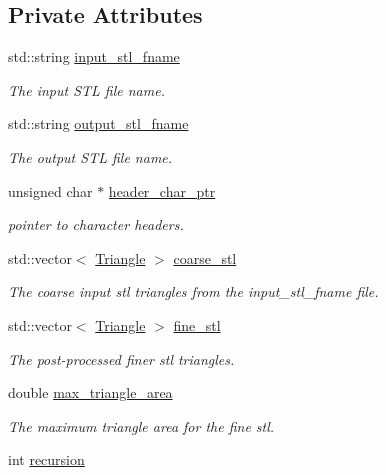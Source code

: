 \subsection*{Private Attributes}
\begin{DoxyCompactItemize}
\item 
std\-::string \hyperlink{classkia_1_1Mesh_aec61d34b51d3fbd92b7198465acac609}{input\-\_\-stl\-\_\-fname}
\begin{DoxyCompactList}\small\item\em The input S\-T\-L file name. \end{DoxyCompactList}\item 
std\-::string \hyperlink{classkia_1_1Mesh_a09889245e99dcf6e1fc79802f4898be5}{output\-\_\-stl\-\_\-fname}
\begin{DoxyCompactList}\small\item\em The output S\-T\-L file name. \end{DoxyCompactList}\item 
unsigned char $\ast$ \hyperlink{classkia_1_1Mesh_a07e1afe05908123512092752cf5a6215}{header\-\_\-char\-\_\-ptr}
\begin{DoxyCompactList}\small\item\em pointer to character headers. \end{DoxyCompactList}\item 
std\-::vector$<$ \hyperlink{classkia_1_1Triangle}{Triangle} $>$ \hyperlink{classkia_1_1Mesh_a5cdfbbf0ea30fb6a1bc220aab1252c1c}{coarse\-\_\-stl}
\begin{DoxyCompactList}\small\item\em The coarse input stl triangles from the input\-\_\-stl\-\_\-fname file. \end{DoxyCompactList}\item 
std\-::vector$<$ \hyperlink{classkia_1_1Triangle}{Triangle} $>$ \hyperlink{classkia_1_1Mesh_a16b183e73546b40a40592c0a42f2eba2}{fine\-\_\-stl}
\begin{DoxyCompactList}\small\item\em The post-\/processed finer stl triangles. \end{DoxyCompactList}\item 
double \hyperlink{classkia_1_1Mesh_a10186516a1cf2cd6d65a84cbf31517d6}{max\-\_\-triangle\-\_\-area}
\begin{DoxyCompactList}\small\item\em The maximum triangle area for the fine stl. \end{DoxyCompactList}\item 
int \hyperlink{classkia_1_1Mesh_a9667b9f17601ac430d74a9889538c43c}{recursion}
\end{DoxyCompactItemize}


